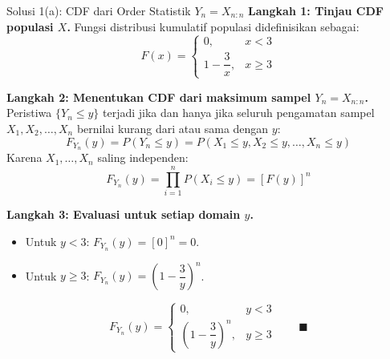 \documentclass[10pt,twoside]{article}
\begin{document}
\begin{solbox}{Solusi 1(a): CDF dari Order Statistik $Y_n = X_{n:n}$}
\textbf{Langkah 1: Tinjau CDF populasi $X$.}
Fungsi distribusi kumulatif populasi didefinisikan sebagai:
\[
F(x) = \begin{cases} 0, & x < 3 \\ 1 - \dfrac{3}{x}, & x \ge 3 \end{cases}
\]

\textbf{Langkah 2: Menentukan CDF dari maksimum sampel $Y_n = X_{n:n}$.}
Peristiwa $\{Y_n \le y\}$ terjadi jika dan hanya jika seluruh pengamatan sampel $X_1, X_2, \dots, X_n$ bernilai kurang dari atau sama dengan $y$:
\[
F_{Y_n}(y) = P(Y_n \le y) = P(X_1 \le y, X_2 \le y, \dots, X_n \le y)
\]
Karena $X_1, \dots, X_n$ saling independen:
\[
F_{Y_n}(y) = \prod_{i=1}^n P(X_i \le y) = [F(y)]^n
\]

\textbf{Langkah 3: Evaluasi untuk setiap domain $y$.}
\begin{itemize}
  \item Untuk $y < 3$: $F_{Y_n}(y) = [0]^n = 0$.
  \item Untuk $y \ge 3$: $F_{Y_n}(y) = \left(1 - \dfrac{3}{y}\right)^n$.
\end{itemize}

\[
\boxed{F_{Y_n}(y) = \begin{cases} 0, & y < 3 \\ \left(1 - \dfrac{3}{y}\right)^n, & y \ge 3 \end{cases}} \qquad \blacksquare
\]
\end{solbox}
\end{document}
